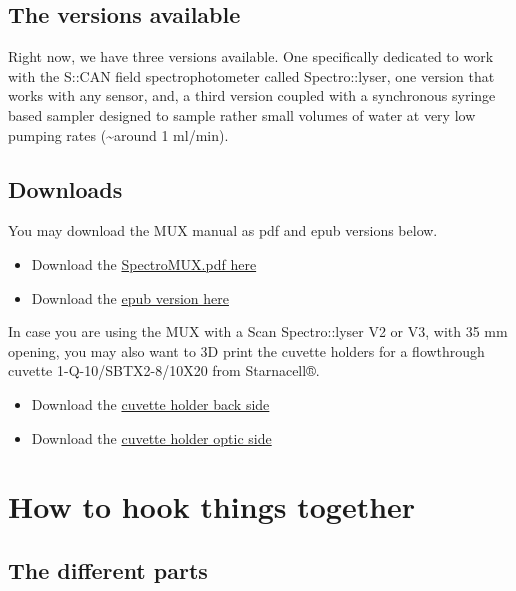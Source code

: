 \documentclass[]{book}
\begin{document}
\hypertarget{the-versions-available}{%
\section{The versions available}\label{the-versions-available}}

Right now, we have three versions available. One specifically dedicated to work with the S::CAN field spectrophotometer called Spectro::lyser, one version that works with any sensor, and, a third version coupled with a synchronous syringe based sampler designed to sample rather small volumes of water at very low pumping rates (\textasciitilde{}around 1 ml/min).

\hypertarget{downloads}{%
\section{Downloads}\label{downloads}}

You may download the MUX manual as pdf and epub versions below.

\begin{itemize}
\item
  Download the \href{https://francoisbirgand.github.io/Multiplexo/MUXManual.pdf}{SpectroMUX.pdf here}
\item
  Download the \href{https://francoisbirgand.github.io/Multiplexo/MUXManual.epub}{epub version here}
\end{itemize}

In case you are using the MUX with a Scan Spectro::lyser V2 or V3, with 35 mm opening, you may also want to 3D print the cuvette holders for a flowthrough cuvette 1-Q-10/SBTX2-8/10X20 from Starnacell®.

\begin{itemize}
\item
  Download the \href{https://francoisbirgand.github.io/Multiplexo/cuvette_holder_back_side.stl}{cuvette holder back side}
\item
  Download the \href{https://francoisbirgand.github.io/Multiplexo/cuvette_holder_optics_side.stl}{cuvette holder optic side}
\end{itemize}

\hypertarget{intro}{%
\chapter{How to hook things together}\label{intro}}

\hypertarget{the-different-parts}{%
\section{The different parts}\label{the-different-parts}}
\end{document}
